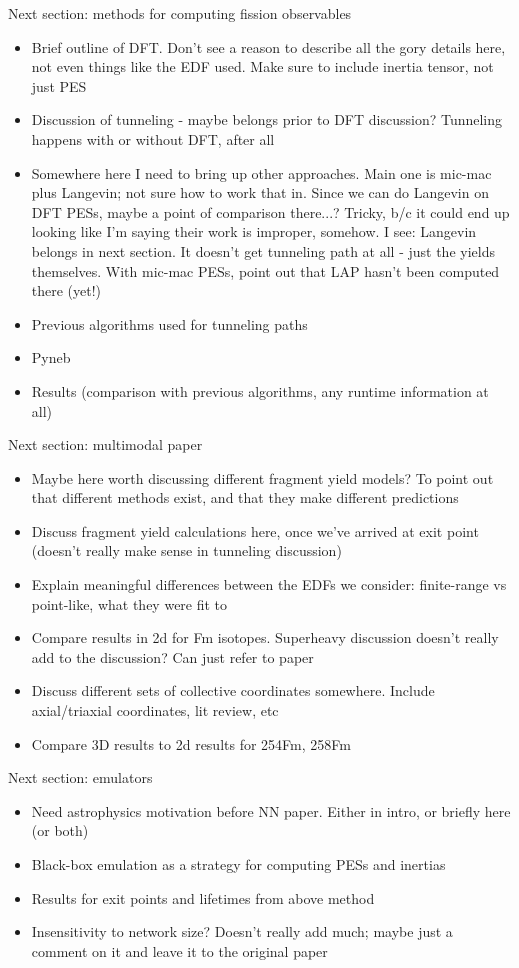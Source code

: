 \documentclass[../thesis.tex]{subfiles}
\begin{document}
Next section: methods for computing fission observables
\begin{itemize}
	\item Brief outline of DFT. Don't see a reason to describe all the gory details here, not even things like the EDF used. Make sure to include inertia tensor, not just PES
	\item Discussion of tunneling - maybe belongs prior to DFT discussion? Tunneling happens with or without DFT, after all
	\item Somewhere here I need to bring up other approaches. Main one is mic-mac plus Langevin; not sure how to work that in. Since we can do Langevin on DFT PESs, maybe a point of comparison there...? Tricky, b/c it could end up looking like I'm saying their work is improper, somehow. I see: Langevin belongs in next section. It doesn't get tunneling path at all - just the yields themselves. With mic-mac PESs, point out that LAP hasn't been computed there (yet!)
	\item Previous algorithms used for tunneling paths
	\item Pyneb
	\item Results (comparison with previous algorithms, any runtime information at all)
\end{itemize}

Next section: multimodal paper
\begin{itemize}
	\item Maybe here worth discussing different fragment yield models? To point out that different methods exist, and that they make different predictions
	\item Discuss fragment yield calculations here, once we've arrived at exit point (doesn't really make sense in tunneling discussion)
	\item Explain meaningful differences between the EDFs we consider: finite-range vs point-like, what they were fit to
	\item Compare results in 2d for Fm isotopes. Superheavy discussion doesn't really add to the discussion? Can just refer to paper
	\item Discuss different sets of collective coordinates somewhere. Include axial/triaxial coordinates, lit review, etc
	\item Compare 3D results to 2d results for 254Fm, 258Fm
\end{itemize}

Next section: emulators
\begin{itemize}
	\item Need astrophysics motivation before NN paper. Either in intro, or briefly here (or both)
	\item Black-box emulation as a strategy for computing PESs and inertias
	\item Results for exit points and lifetimes from above method
	\item Insensitivity to network size? Doesn't really add much; maybe just a comment on it and leave it to the original paper
\end{itemize}
\end{document}
